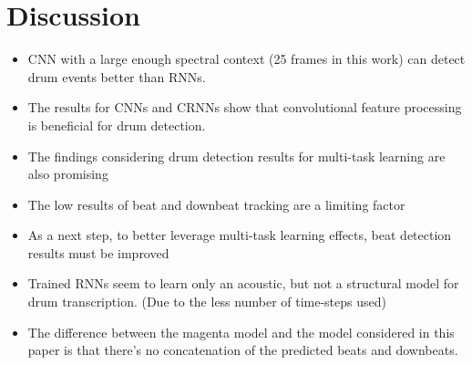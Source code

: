 \section*{Discussion} 
\begin{itemize}
\item CNN with a large enough spectral context (25 frames in this work) can detect drum events better than RNNs.
\item The results for CNNs and CRNNs show that convolutional feature processing is beneficial for drum detection.
\item The findings considering drum detection results for multi-task learning are also promising
\item The low results of beat and downbeat tracking are a limiting factor
\item As a next step, to better leverage multi-task learning effects, beat detection results must be improved
\item Trained RNNs seem to learn only an acoustic, but not a structural model for drum transcription. (Due to the less number of time-steps used)
\item The difference between the magenta model and the model considered in this paper is that there’s no concatenation of the predicted beats and downbeats. 
\end{itemize}  


